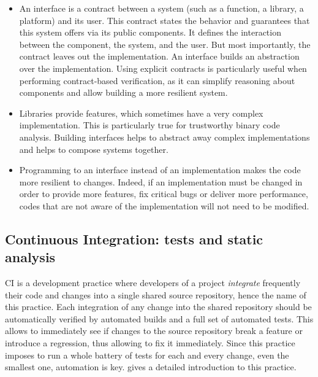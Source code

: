 \documentclass{kththesis}
\begin{document}
{\begin{itemize}
    \item An interface is a contract between a system (such as a function, a library, a platform) and its user. This contract states the behavior and guarantees that this system offers via its public components. It defines the interaction between the component, the system, and the user. But most importantly, the contract leaves out the implementation. An interface builds an abstraction over the implementation. Using explicit contracts is particularly useful when performing contract-based verification, as it can simplify reasoning about components and allow building a more resilient system.
    \item Libraries provide features, which sometimes have a very complex implementation. This is particularly true for trustworthy binary code analysis. Building interfaces helps to abstract away complex implementations and helps to compose systems together.
    \item Programming to an interface instead of an implementation makes the code more resilient to changes. Indeed, if an implementation must be changed in order to provide more features, fix critical bugs or deliver more performance, codes that are not aware of the implementation will not need to be modified.
\end{itemize}


\subsection{Continuous Integration: tests and static analysis}

\acrfull{CI} is a development practice where developers of a project \textit{integrate} frequently their code and changes into a single shared source repository, hence the name of this practice. Each integration of any change into the shared repository should be automatically verified by automated builds and a full set of automated tests. This allows to immediately see if changes to the source repository break a feature or introduce a regression, thus allowing to fix it immediately. Since this practice imposes to run a whole battery of tests for each and every change, even the smallest one, automation is key. \cite{martin_fowler_continuous_nodate} gives a detailed introduction to this practice.

}
\end{document}
